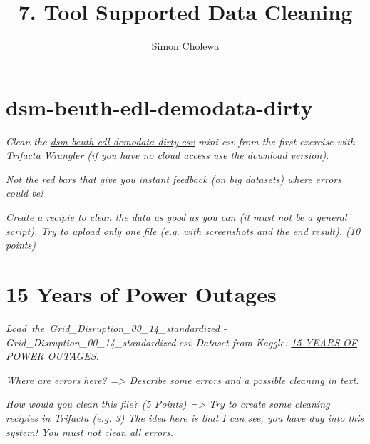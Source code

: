 \documentclass[11pt,a4paper]{article}
\author{Simon Cholewa}
\title{7. Tool Supported Data Cleaning}
\begin{document}
\maketitle

\section{dsm-beuth-edl-demodata-dirty}

\textit{Clean the \hyperref{https://github.com/edlich/eternalrepo/blob/master/DS-WAHLFACH/dsm-beuth-edl-demodata-dirty.csv}{}{}{dsm-beuth-edl-demodata-dirty.csv} mini csv from the first exercise with Trifacta Wrangler (if you have no cloud access use the download version).}



\textit{Not the red bars that give you instant feedback (on big datasets) where errors could be!}

\textit{Create a recipie to clean the data as good as you can (it must not be a general script). Try to upload only one file (e.g. with screenshots and the end result). (10 points)}


\section{15 Years of Power Outages}

\textit{Load\ the\ Grid\_Disruption\_00\_14\_standardized -}\\ \textit{Grid\_Disruption\_00\_14\_standardized.csv Dataset from Kaggle:
\hyperref{https://www.kaggle.com/autunno/15-years-of-power-outages}{}{}{15 YEARS OF POWER OUTAGES}.}

\textit{Where are errors here? => Describe some errors and a possible cleaning in text.}

\textit{How would you clean this file? (5 Points) => Try to create some cleaning recipies in Trifacta (e.g. 3) The idea here is that I can see, you have dug into this system! You must not clean all errors.}
\end{document}
